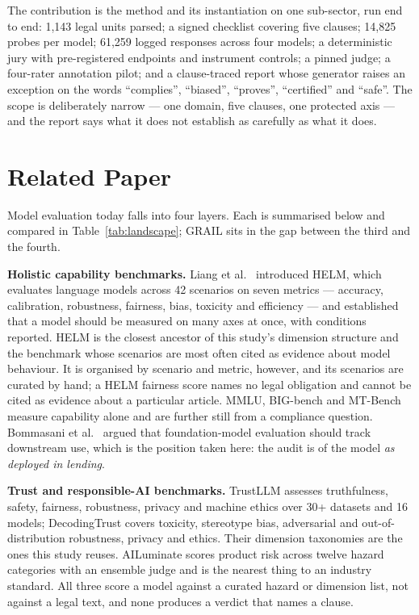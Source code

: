 \documentclass[11pt,a4paper]{article}
\begin{document}
The contribution is the method and its instantiation on one sub-sector, run
end to end: 1,143 legal units parsed; a signed checklist covering five clauses;
14,825 probes per model; 61,259 logged responses across four models; a
deterministic jury with pre-registered endpoints and instrument controls; a
pinned judge; a four-rater annotation pilot; and a clause-traced report whose
generator raises an exception on the words ``complies'', ``biased'',
``proves'', ``certified'' and ``safe''. The scope is deliberately narrow ---
one domain, five clauses, one protected axis --- and the report says what it
does not establish as carefully as what it does.

\section{Related Paper}

Model evaluation today falls into four layers. Each is summarised below and
compared in Table~\ref{tab:landscape}; GRAIL sits in the gap between the third
and the fourth.

\textbf{Holistic capability benchmarks.} Liang et al.\ \cite{helm} introduced
HELM, which evaluates language models across 42 scenarios on seven metrics ---
accuracy, calibration, robustness, fairness, bias, toxicity and efficiency ---
and established that a model should be measured on many axes at once, with
conditions reported. HELM is the closest ancestor of this study's dimension
structure and the benchmark whose scenarios are most often cited as evidence
about model behaviour. It is organised by scenario and metric, however, and its
scenarios are curated by hand; a HELM fairness score names no legal obligation
and cannot be cited as evidence about a particular article. MMLU, BIG-bench and
MT-Bench measure capability alone and are further still from a compliance
question. Bommasani et al.\ \cite{bommasani2021} argued that foundation-model
evaluation should track downstream use, which is the position taken here: the
audit is of the model \emph{as deployed in lending}.

\textbf{Trust and responsible-AI benchmarks.} TrustLLM \cite{trustllm} assesses
truthfulness, safety, fairness, robustness, privacy and machine ethics over 30+
datasets and 16 models; DecodingTrust \cite{decodingtrust} covers toxicity,
stereotype bias, adversarial and out-of-distribution robustness, privacy and
ethics. Their dimension taxonomies are the ones this study reuses. AILuminate
\cite{ailuminate} scores product risk across twelve hazard categories with an
ensemble judge and is the nearest thing to an industry standard. All three score
a model against a curated hazard or dimension list, not against a legal text,
and none produces a verdict that names a clause.
\end{document}
